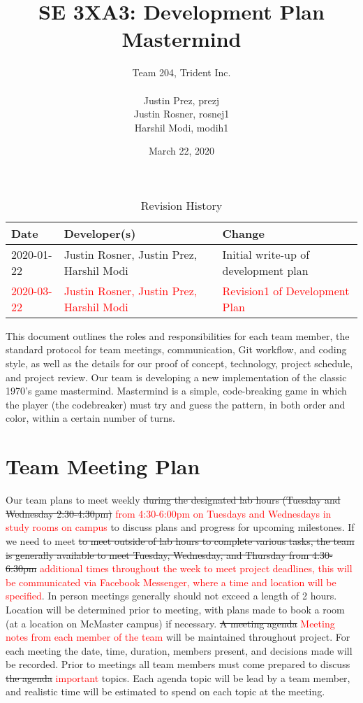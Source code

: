 \documentclass{article}
\title{SE 3XA3: Development Plan\\ Mastermind}
\author{Team 204, Trident Inc.\\
		\\ Justin Prez, prezj
		\\ Justin Rosner, rosnej1
		\\ Harshil Modi, modih1
}
\date{March 22, 2020}
\begin{document}
\begin{table}[hp]
\caption{Revision History} \label{TblRevisionHistory}
\begin{tabularx}{\textwidth}{llX}
\toprule
\textbf{Date} & \textbf{Developer(s)} & \textbf{Change}\\
\midrule
2020-01-22 & Justin Rosner, Justin Prez, Harshil Modi & Initial write-up of development plan\\
\textcolor{red}{2020-03-22} & \textcolor{red}{Justin Rosner, Justin Prez, Harshil Modi} & \textcolor{red}{Revision1 of Development Plan}\\
\bottomrule
\end{tabularx}
\end{table}


\newpage

\maketitle

This document outlines the roles and responsibilities for each team member, the standard protocol for team meetings, communication, Git workflow, and coding style, as well as the details for our proof of concept, technology, project schedule, and project review. Our team is developing a new implementation of the classic 1970's game mastermind. Mastermind is a simple, code-breaking game in which the player (the codebreaker) must try and guess the pattern, in both order and color, within a certain number of turns.

\section{Team Meeting Plan}

Our team plans to meet weekly \sout{during the designated lab hours (Tuesday and Wednesday 2:30-4:30pm)} \textcolor{red}{from 4:30-6:00pm on Tuesdays and Wednesdays in study rooms on campus} to discuss plans and progress for upcoming milestones. If we need to meet \sout{to meet outside of lab hours to complete various tasks, the team is generally available to meet Tuesday, Wednesday, and Thursday from 4:30-6:30pm} \textcolor{red}{additional times throughout the week to meet project deadlines, this will be communicated via Facebook Messenger, where a time and location will be specified}. In person meetings generally should not exceed a length of 2 hours. Location will be determined prior to meeting, with plans made to book a room (at a location on McMaster campus) if necessary. \sout{A meeting agenda} \textcolor{red}{Meeting notes from each member of the team} will be maintained throughout project. For each meeting the date, time, duration, members present, and decisions made will be recorded. Prior to meetings all team members must come prepared to discuss \sout{the agenda} \textcolor{red}{important} topics. Each agenda topic will be lead by a team member, and realistic time will be estimated to spend on each topic at the meeting.
\end{document}

